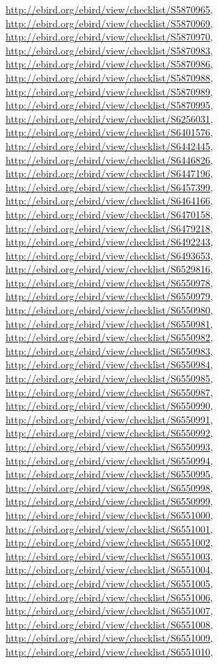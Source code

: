 \documentclass[9pt, article]{memoir}
\begin{document}
\begin{multicols}{2}
\url{http://ebird.org/ebird/view/checklist/S5870965}, 
\url{http://ebird.org/ebird/view/checklist/S5870969}, 
\url{http://ebird.org/ebird/view/checklist/S5870970}, 
\url{http://ebird.org/ebird/view/checklist/S5870983}, 
\url{http://ebird.org/ebird/view/checklist/S5870986}, 
\url{http://ebird.org/ebird/view/checklist/S5870988}, 
\url{http://ebird.org/ebird/view/checklist/S5870989}, 
\url{http://ebird.org/ebird/view/checklist/S5870995}, 
\url{http://ebird.org/ebird/view/checklist/S6256031}, 
\url{http://ebird.org/ebird/view/checklist/S6401576}, 
\url{http://ebird.org/ebird/view/checklist/S6442445}, 
\url{http://ebird.org/ebird/view/checklist/S6446826}, 
\url{http://ebird.org/ebird/view/checklist/S6447196}, 
\url{http://ebird.org/ebird/view/checklist/S6457399}, 
\url{http://ebird.org/ebird/view/checklist/S6464166}, 
\url{http://ebird.org/ebird/view/checklist/S6470158}, 
\url{http://ebird.org/ebird/view/checklist/S6479218}, 
\url{http://ebird.org/ebird/view/checklist/S6492243}, 
\url{http://ebird.org/ebird/view/checklist/S6493653}, 
\url{http://ebird.org/ebird/view/checklist/S6529816}, 
\url{http://ebird.org/ebird/view/checklist/S6550978}, 
\url{http://ebird.org/ebird/view/checklist/S6550979}, 
\url{http://ebird.org/ebird/view/checklist/S6550980}, 
\url{http://ebird.org/ebird/view/checklist/S6550981}, 
\url{http://ebird.org/ebird/view/checklist/S6550982}, 
\url{http://ebird.org/ebird/view/checklist/S6550983}, 
\url{http://ebird.org/ebird/view/checklist/S6550984}, 
\url{http://ebird.org/ebird/view/checklist/S6550985}, 
\url{http://ebird.org/ebird/view/checklist/S6550987}, 
\url{http://ebird.org/ebird/view/checklist/S6550990}, 
\url{http://ebird.org/ebird/view/checklist/S6550991}, 
\url{http://ebird.org/ebird/view/checklist/S6550992}, 
\url{http://ebird.org/ebird/view/checklist/S6550993}, 
\url{http://ebird.org/ebird/view/checklist/S6550994}, 
\url{http://ebird.org/ebird/view/checklist/S6550995}, 
\url{http://ebird.org/ebird/view/checklist/S6550998}, 
\url{http://ebird.org/ebird/view/checklist/S6550999}, 
\url{http://ebird.org/ebird/view/checklist/S6551000}, 
\url{http://ebird.org/ebird/view/checklist/S6551001}, 
\url{http://ebird.org/ebird/view/checklist/S6551002}, 
\url{http://ebird.org/ebird/view/checklist/S6551003}, 
\url{http://ebird.org/ebird/view/checklist/S6551004}, 
\url{http://ebird.org/ebird/view/checklist/S6551005}, 
\url{http://ebird.org/ebird/view/checklist/S6551006}, 
\url{http://ebird.org/ebird/view/checklist/S6551007}, 
\url{http://ebird.org/ebird/view/checklist/S6551008}, 
\url{http://ebird.org/ebird/view/checklist/S6551009}, 
\url{http://ebird.org/ebird/view/checklist/S6551010}, 

\end{multicols}
\end{document}
